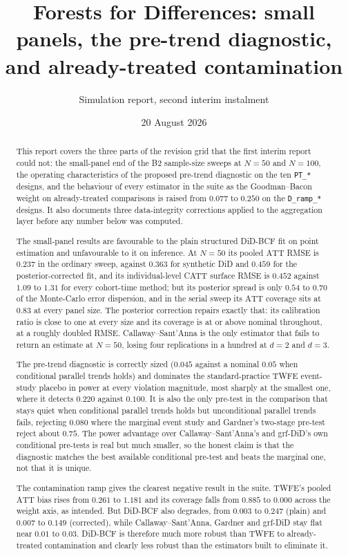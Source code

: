 \documentclass[11pt]{article}
\title{\textbf{Forests for Differences}: small panels, the pre-trend
diagnostic, and already-treated contamination}
\author{Simulation report, second interim instalment}
\date{20 August 2026}
\newcommand{\att}{\mathrm{ATT}}
\begin{document}
\maketitle

\begin{abstract}
This report covers the three parts of the revision grid that the first interim
report could not: the small-panel end of the B2 sample-size sweeps at $N=50$
and $N=100$, the operating characteristics of the proposed pre-trend
diagnostic on the ten \texttt{PT\_*} designs, and the behaviour of every
estimator in the suite as the Goodman--Bacon weight on already-treated
comparisons is raised from $0.077$ to $0.250$ on the \texttt{D\_ramp\_*}
designs. It also documents three data-integrity corrections applied to the
aggregation layer before any number below was computed.

The small-panel results are favourable to the plain structured DiD-BCF fit on
point estimation and unfavourable to it on inference. At $N=50$ its pooled
$\att$ RMSE is $0.237$ in the ordinary sweep, against $0.363$ for synthetic
DiD and $0.459$ for the posterior-corrected fit, and its individual-level CATT
surface RMSE is $0.452$ against $1.09$ to $1.31$ for every cohort-time method;
but its posterior spread is only $0.54$ to $0.70$ of the Monte-Carlo error
dispersion, and in the serial sweep its $\att$ coverage sits at $0.83$ at every
panel size. The posterior correction repairs exactly that: its calibration
ratio is close to one at every size and its coverage is at or above nominal
throughout, at a roughly doubled RMSE. Callaway--Sant'Anna is the only
estimator that fails to return an estimate at $N=50$, losing four replications
in a hundred at $d=2$ and $d=3$.

The pre-trend diagnostic is correctly sized ($0.045$ against a nominal $0.05$
when conditional parallel trends holds) and dominates the standard-practice
TWFE event-study placebo in power at every violation magnitude, most sharply at
the smallest one, where it detects $0.220$ against $0.100$. It is also the only
pre-test in the comparison that stays quiet when conditional parallel trends
holds but unconditional parallel trends fails, rejecting $0.080$ where the
marginal event study and Gardner's two-stage pre-test reject about $0.75$. The
power advantage over Callaway--Sant'Anna's and grf-DiD's own conditional
pre-tests is real but much smaller, so the honest claim is that the diagnostic
matches the best available conditional pre-test and beats the marginal one, not
that it is unique.

The contamination ramp gives the clearest negative result in the suite. TWFE's
pooled $\att$ bias rises from $0.261$ to $1.181$ and its coverage falls from
$0.885$ to $0.000$ across the weight axis, as intended. But DiD-BCF also
degrades, from $0.003$ to $0.247$ (plain) and $0.007$ to $0.149$ (corrected),
while Callaway--Sant'Anna, Gardner and grf-DiD stay flat near $0.01$ to $0.03$.
DiD-BCF is therefore much more robust than TWFE to already-treated
contamination and clearly less robust than the estimators built to eliminate
it.
\end{abstract}
\end{document}

